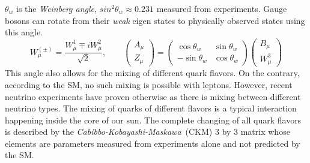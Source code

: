 $\theta_{w}$ is the \textit{Weinberg angle}, $sin^{2}\theta_{w} \approx 0.231$ measured from experiments.
Gauge bosons can rotate from their \textit{weak} eigen states to physically observed states using this angle.
\begin{equation}
 W^{(\pm)}_{\mu} = \frac{W^{1}_{\mu} \mp i W^{2}_{\mu}}{\sqrt{2}}, \quad \quad 
 {\begin{pmatrix} A_{\mu} \\ Z_{\mu}  \end{pmatrix} } = {\begin{pmatrix}  \cos{\theta_{w}} & \sin{\theta_{w}} \\ -\sin{\theta_{w}} & \cos{\theta_{w}}   \end{pmatrix}}  {\begin{pmatrix} B_{\mu} \\ W^{3}_{\mu} \end{pmatrix} }
\end{equation}
This angle also allows for the mixing of different quark flavors. On the contrary, according to the SM, no such mixing is possible with leptons. However, recent neutrino experiments have proven otherwise as there is mixing between different neutrino types. The mixing of quarks of different flavors is a typical interaction happening inside the core of our sun. The complete changing of all quark flavors is described by the \textit{Cabibbo-Kobayashi-Maskawa}~(CKM) 3 by 3 matrix whose elements are parameters measured from experiments alone and not predicted by the SM.

